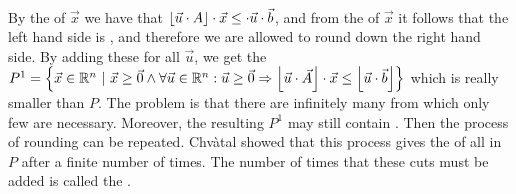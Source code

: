 \paragraph{}
By the  of $\vec{x}$ we have that $\left\lfloor \vec{u}\cdot A \right\rfloor\cdot\vec{x}\leq\cdot\vec{u}\cdot\vec{b}$, and from the  of $\vec{x}$ it follows that the left hand side is , and therefore we are allowed to round down the right hand side. By adding these  for all  $\vec{u}$, we get the  $P^1=\left\{ \vec{x}\in\mathbb{R}^n\ |\ \vec{x}\geq\vec{0}\wedge\forall \vec{u}\in\mathbb{R}^n:\vec{u}\geq\vec{0}\Rightarrow\left\lfloor \vec{u}\cdot\vec{A} \right\rfloor\cdot\vec{x}\leq\left\lfloor \vec{u}\cdot\vec{b} \right\rfloor \right\}$ which is really smaller than $P$. The problem is that there are infinitely many  from which only few are necessary. Moreover, the resulting  $P^1$ may still contain . Then the process of rounding can be repeated. Chv\`atal showed that this process gives the  of all  in $P$ after a finite number of times. The number of times that these cuts must be added is called the .


